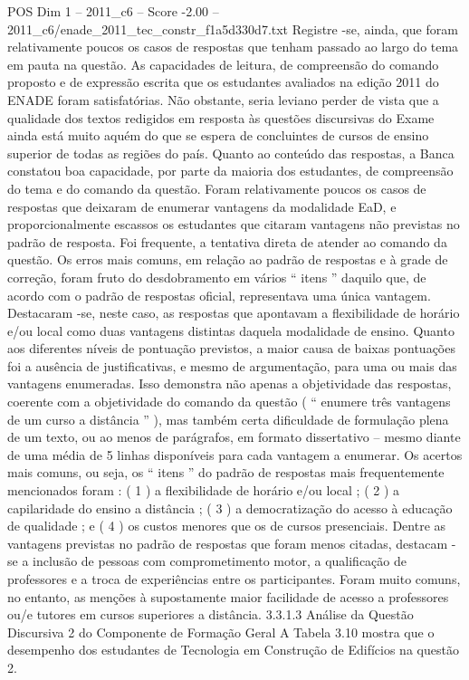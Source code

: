 \begin{textsample}{POS Dim 1 – 2011\_c6 – Score -2.00 – 2011\_c6/enade\_2011\_tec\_constr\_f1a5d330d7.txt}
Registre -se, ainda, que foram relativamente poucos os casos de respostas que tenham passado ao largo do tema em pauta na questão.
As capacidades de leitura, de compreensão do comando proposto e de expressão escrita que os estudantes avaliados na edição 2011 do ENADE foram satisfatórias.
Não obstante, seria leviano perder de vista que a qualidade dos textos redigidos em resposta às questões discursivas do Exame ainda está muito aquém do que se espera de concluintes de cursos de ensino superior de todas as regiões do país.
Quanto ao conteúdo das respostas, a Banca constatou boa capacidade, por parte da maioria dos estudantes, de compreensão do tema e do comando da questão.
Foram relativamente poucos os casos de respostas que deixaram de enumerar vantagens da modalidade EaD, e proporcionalmente escassos os estudantes que citaram vantagens não previstas no padrão de resposta.
Foi frequente, a tentativa direta de atender ao comando da questão.
Os erros mais comuns, em relação ao padrão de respostas e à grade de correção, foram fruto do desdobramento em vários “ itens ” daquilo que, de acordo com o padrão de respostas oficial, representava uma única vantagem.
Destacaram -se, neste caso, as respostas que apontavam a flexibilidade de horário e/ou local como duas vantagens distintas daquela modalidade de ensino.
Quanto aos diferentes níveis de pontuação previstos, a maior causa de baixas pontuações foi a ausência de justificativas, e mesmo de argumentação, para uma ou mais das vantagens enumeradas.
Isso demonstra não apenas a objetividade das respostas, coerente com a objetividade do comando da questão ( “ enumere três vantagens de um curso a distância ” ), mas também certa dificuldade de formulação plena de um texto, ou ao menos de parágrafos, em formato dissertativo – mesmo diante de uma média de 5 linhas disponíveis para cada vantagem a enumerar.
Os acertos mais comuns, ou seja, os “ itens ” do padrão de respostas mais frequentemente mencionados foram : ( 1 ) a flexibilidade de horário e/ou local ; ( 2 ) a capilaridade do ensino a distância ; ( 3 ) a democratização do acesso à educação de qualidade ; e ( 4 ) os custos menores que os de cursos presenciais.
Dentre as vantagens previstas no padrão de respostas que foram menos citadas, destacam -se a inclusão de pessoas com comprometimento motor, a qualificação de professores e a troca de experiências entre os participantes.
Foram muito comuns, no entanto, as menções à supostamente maior facilidade de acesso a professores ou/e tutores em cursos superiores a distância. 3.3.1.3 Análise da Questão Discursiva 2 do Componente de Formação Geral A Tabela 3.10 mostra que o desempenho dos estudantes de Tecnologia em Construção de Edifícios na questão 2.

\end{textsample}
